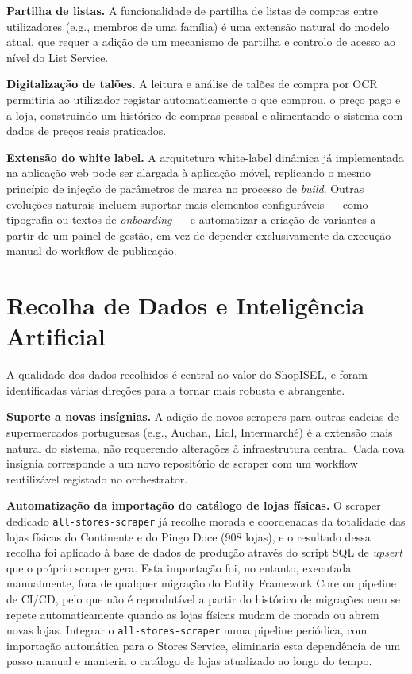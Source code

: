 \textbf{Partilha de listas.} A funcionalidade de partilha de listas de compras entre utilizadores (e.g., membros de uma família) é uma extensão natural do modelo atual, que requer a adição de um mecanismo de partilha e controlo de acesso ao nível do List Service.

\textbf{Digitalização de talões.} A leitura e análise de talões de compra por \ac{OCR} permitiria ao utilizador registar automaticamente o que comprou, o preço pago e a loja, construindo um histórico de compras pessoal e alimentando o sistema com dados de preços reais praticados.

\textbf{Extensão do white label.} A arquitetura white-label dinâmica já implementada na aplicação web pode ser alargada à aplicação móvel, replicando o mesmo princípio de injeção de parâmetros de marca no processo de \textit{build}. Outras evoluções naturais incluem suportar mais elementos configuráveis — como tipografia ou textos de \textit{onboarding} — e automatizar a criação de variantes a partir de um painel de gestão, em vez de depender exclusivamente da execução manual do workflow de publicação.

\section{Recolha de Dados e Inteligência Artificial}
\label{sec:7.2}

A qualidade dos dados recolhidos é central ao valor do ShopISEL, e foram identificadas várias direções para a tornar mais robusta e abrangente.

\textbf{Suporte a novas insígnias.} A adição de novos scrapers para outras cadeias de supermercados portuguesas (e.g., Auchan, Lidl, Intermarché) é a extensão mais natural do sistema, não requerendo alterações à infraestrutura central. Cada nova insígnia corresponde a um novo repositório de scraper com um workflow reutilizável registado no orchestrator.

\textbf{Automatização da importação do catálogo de lojas físicas.} O scraper dedicado \texttt{all-stores-scraper} já recolhe morada e coordenadas da totalidade das lojas físicas do Continente e do Pingo Doce (908 lojas), e o resultado dessa recolha foi aplicado à base de dados de produção através do script \ac{SQL} de \textit{upsert} que o próprio scraper gera. Esta importação foi, no entanto, executada manualmente, fora de qualquer migração do Entity Framework Core ou pipeline de \ac{CI/CD}, pelo que não é reprodutível a partir do histórico de migrações nem se repete automaticamente quando as lojas físicas mudam de morada ou abrem novas lojas. Integrar o \texttt{all-stores-scraper} numa pipeline periódica, com importação automática para o Stores Service, eliminaria esta dependência de um passo manual e manteria o catálogo de lojas atualizado ao longo do tempo.

